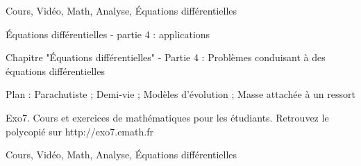 
Cours, Vidéo, Math, Analyse, Équations différentielles



Équations différentielles - partie 4 : applications



Chapitre "Équations différentielles" - Partie 4 : Problèmes conduisant à des équations différentielles

Plan : Parachutiste ; Demi-vie ; Modèles d'évolution ;
Masse attachée à un ressort

Exo7. Cours et exercices de mathématiques pour les étudiants.
Retrouvez le polycopié sur http://exo7.emath.fr


Cours, Vidéo, Math, Analyse, Équations différentielles

